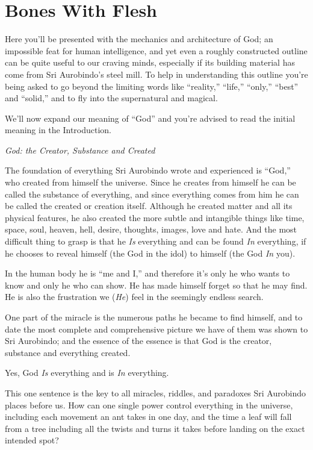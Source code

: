 \documentclass[12pt,a4paper]{book}
\begin{document}
\chapter*{Bones With Flesh}

Here you'll be presented with the mechanics and architecture of God;
an impossible feat for human intelligence, and yet even a roughly
constructed outline can be quite useful to our craving minds,
especially if its building material has come from Sri Aurobindo's
steel mill. To help in understanding this outline you're being asked
to go beyond the limiting words like ``reality,'' ``life,'' ``only,''
``best'' and ``solid,'' and to fly into the supernatural and magical.

We'll now expand our meaning of ``God'' and you're advised to read the
initial meaning in the Introduction.

\noindent \emph{God: the Creator, Substance and Created}

The foundation of everything Sri Aurobindo wrote and experienced is
``God,'' who created from himself the universe. Since he creates from
himself he can be called the substance of everything, and since
everything comes from him he can be called the created or creation
itself. Although he created matter and all its physical features, he
also created the more subtle and intangible things like time, space,
soul, heaven, hell, desire, thoughts, images, love and hate. And the
most difficult thing to grasp is that he \emph{Is} everything and can be
found \emph{In} everything, if he chooses to reveal himself (the God in the
idol) to himself (the God \emph{In} you).

In the human body he is ``me and I,'' and therefore it's only he who
wants to know and only he who can show. He has made himself forget so
that he may find. He is also the frustration we (\emph{He}) feel in the
seemingly endless search.

One part of the miracle is the numerous paths he became to find
himself, and to date the most complete and comprehensive picture we
have of them was shown to Sri Aurobindo; and the essence of the
essence is that God is the creator, substance and everything created.

\noindent Yes, God \emph{Is} everything and is \emph{In} everything.

This one sentence is the key to all miracles, riddles, and paradoxes
Sri Aurobindo places before us. How can one single power control
everything in the universe, including each movement an ant takes in
one day, and the time a leaf will fall from a tree including all the
twists and turns it takes before landing on the exact intended spot?
\end{document}
